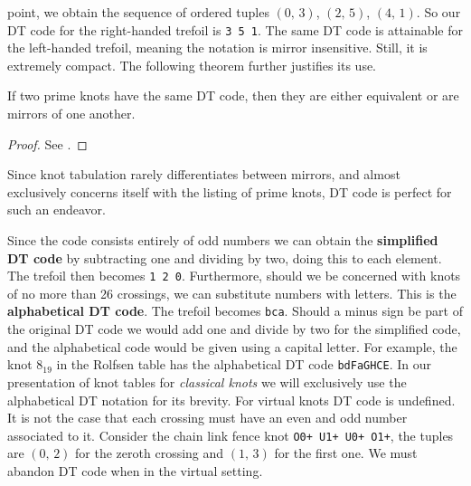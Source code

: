         point, we obtain the sequence of ordered tuples
        $(0,\,3)$, $(2,\,5)$, $(4,\,1)$. So our DT code for the right-handed
        trefoil is \texttt{3 5 1}. The same DT code is attainable for the
        left-handed trefoil, meaning the notation is mirror insensitive. Still,
        it is extremely compact. The following theorem further justifies its
        use.
        \begin{theorem}
            If two prime knots have the same DT code, then they are either
            equivalent or are mirrors of one another.
        \end{theorem}
        \begin{proof}
            See \cite{DOWKER198319}.
        \end{proof}
        Since knot tabulation rarely differentiates between mirrors, and
        almost exclusively concerns itself with the listing of prime knots,
        DT code is perfect for such an endeavor.
        \par\hfill\par
        Since the code consists entirely of odd numbers we can obtain the
        \textbf{simplified DT code} by subtracting one and dividing by two,
        doing this to each element. The trefoil then becomes
        \texttt{1 2 0}. Furthermore, should we be concerned with knots of
        no more than 26 crossings, we can substitute numbers with letters.
        This is the \textbf{alphabetical DT code}. The trefoil becomes
        \texttt{bca}. Should a minus sign be part of the original DT code
        we would add one and divide by two for the simplified code, and the
        alphabetical code would be given using a capital letter. For example,
        the knot $8_{19}$ in the Rolfsen table
        has the alphabetical DT code \texttt{bdFaGHCE}. In our presentation of
        knot tables for \textit{classical knots} we will exclusively use the
        alphabetical DT notation for its brevity. For virtual knots DT code is
        undefined. It is not the case that each crossing must have an even and
        odd number associated to it. Consider the chain link fence knot
        \texttt{O0+ U1+ U0+ O1+}, the tuples are $(0,\,2)$ for the zeroth
        crossing and $(1,\,3)$ for the first one. We must abandon DT code when
        in the virtual setting.
        \par\hfill\par
